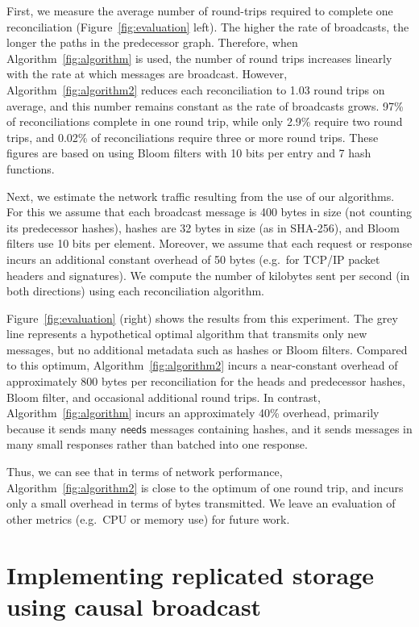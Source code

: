 \documentclass[a4paper,anonymous,USenglish]{lipics-v2019}
\begin{document}
First, we measure the average number of round-trips required to complete one reconciliation (Figure~\ref{fig:evaluation} left).
The higher the rate of broadcasts, the longer the paths in the predecessor graph.
Therefore, when Algorithm~\ref{fig:algorithm} is used, the number of round trips increases linearly with the rate at which messages are broadcast.
However, Algorithm~\ref{fig:algorithm2} reduces each reconciliation to 1.03 round trips on average, and this number remains constant as the rate of broadcasts grows.
97\% of reconciliations complete in one round trip, while only 2.9\% require two round trips, and 0.02\% of reconciliations require three or more round trips.
These figures are based on using Bloom filters with 10 bits per entry and 7 hash functions.

Next, we estimate the network traffic resulting from the use of our algorithms.
For this we assume that each broadcast message is 400 bytes in size (not counting its predecessor hashes), hashes are 32 bytes in size (as in SHA-256), and Bloom filters use 10 bits per element.
Moreover, we assume that each request or response incurs an additional constant overhead of 50 bytes (e.g.\ for TCP/IP packet headers and signatures).
We compute the number of kilobytes sent per second (in both directions) using each reconciliation algorithm.

Figure~\ref{fig:evaluation} (right) shows the results from this experiment.
The grey line represents a hypothetical optimal algorithm that transmits only new messages, but no additional metadata such as hashes or Bloom filters.
Compared to this optimum, Algorithm~\ref{fig:algorithm2} incurs a near-constant overhead of approximately 800 bytes per reconciliation for the heads and predecessor hashes, Bloom filter, and occasional additional round trips.
In contrast, Algorithm~\ref{fig:algorithm} incurs an approximately 40\% overhead, primarily because it sends many $\mathsf{needs}$ messages containing hashes, and it sends messages in many small responses rather than batched into one response.

Thus, we can see that in terms of network performance, Algorithm~\ref{fig:algorithm2} is close to the optimum of one round trip, and incurs only a small overhead in terms of bytes transmitted.
We leave an evaluation of other metrics (e.g.\ CPU or memory use) for future work.

\section{Implementing replicated storage using causal broadcast}\label{sec:byzantine-crdts}
\end{document}
